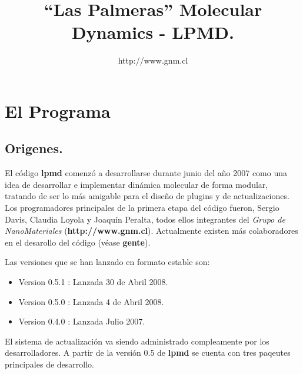 \documentclass[a4paper,10pt]{scrbook}
\newcommand{\lpmd}{\textbf{lpmd }}
\begin{document}
\author{http://www.gnm.cl}
\title{``Las Palmeras'' Molecular Dynamics - \textbf{LPMD}.}
\maketitle

\tableofcontents
\chapter{El Programa}
\label{chap:lpmd}

\section{Origenes.}

El c\'odigo \lpmd comenz\'o a desarrollarse durante junio del a\~no 2007 como una idea de desarrollar e implementar din\'amica molecular de forma modular, tratando de ser lo m\'as amigable para el dise\~no de plugins y de actualizaciones. Los programadores principales de la primera etapa del c\'odigo fueron, Sergio Davis, Claudia Loyola y Joaqu\'in Peralta, todos ellos integrantes del \textit{Grupo de NanoMateriales} (\textbf{http://www.gnm.cl}). Actualmente existen m\'as colaboradores en el desarollo del c\'odigo (v\'ease \textbf{gente}).

Las versiones que se han lanzado en formato estable son:

\begin{itemize}
 \item Version 0.5.1 : Lanzada 30 de Abril 2008.
 \item Version 0.5.0 : Lanzada 4 de Abril 2008.
 \item Version 0.4.0 : Lanzada Julio 2007.
\end{itemize}

El sistema de actualizaci\'on va siendo administrado compleamente por los desarrolladores. A partir de la versi\'on 0.5 de \lpmd se cuenta con tres paqeutes principales de desarrollo.
\end{document}
